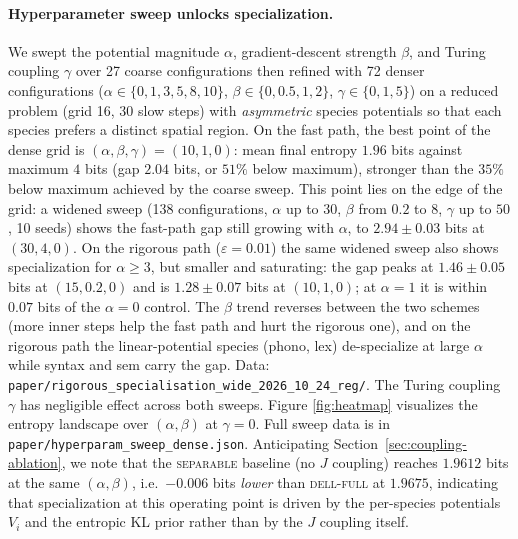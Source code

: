\documentclass[11pt]{article}
\begin{document}
\paragraph{Hyperparameter sweep unlocks specialization.}
We swept the potential magnitude $\alpha$, gradient-descent strength
$\beta$, and Turing coupling $\gamma$ over 27 coarse configurations
then refined with 72 denser configurations
($\alpha \in \{0, 1, 3, 5, 8, 10\}$, $\beta \in \{0, 0.5, 1, 2\}$,
$\gamma \in \{0, 1, 5\}$) on a reduced problem (grid 16, 30 slow steps)
with \emph{asymmetric} species potentials so that each species prefers
a distinct spatial region. On the fast path, the best point of the
dense grid is $(\alpha, \beta, \gamma) = (10, 1, 0)$: mean final
entropy $1.96$ bits against maximum $4$ bits (gap $2.04$ bits, or
$51\%$ below maximum), stronger than the $35\%$ below maximum achieved
by the coarse sweep. This point lies on the edge of the grid: a widened
sweep (138 configurations, $\alpha$ up to $30$, $\beta$ from $0.2$ to
$8$, $\gamma$ up to $50$, 10 seeds) shows the fast-path gap still
growing with $\alpha$, to $2.94 \pm 0.03$ bits at $(30, 4, 0)$. On the
rigorous path ($\varepsilon = 0.01$) the same widened sweep also shows
specialization for $\alpha \ge 3$, but smaller and saturating: the gap
peaks at $1.46 \pm 0.05$ bits at $(15, 0.2, 0)$ and is
$1.28 \pm 0.07$ bits at $(10, 1, 0)$; at $\alpha = 1$ it is within
$0.07$ bits of the $\alpha = 0$ control. The $\beta$ trend reverses
between the two schemes (more inner steps help the fast path and hurt
the rigorous one), and on the rigorous path the linear-potential
species (phono, lex) de-specialize at large $\alpha$ while syntax and
sem carry the gap. Data:
\texttt{paper/rigorous\_specialisation\_wide\_2026\_10\_24\_reg/}. The Turing coupling $\gamma$ has negligible effect
across both sweeps. Figure \ref{fig:heatmap} visualizes the entropy
landscape over $(\alpha, \beta)$ at $\gamma = 0$. Full sweep data is in
\texttt{paper/hyperparam\_sweep\_dense.json}. Anticipating
Section~\ref{sec:coupling-ablation}, we note that the \textsc{separable}
baseline (no $J$ coupling) reaches $1.9612$ bits at the same
$(\alpha, \beta)$, i.e.\ $-0.006$ bits \emph{lower} than \textsc{dell-full}
at $1.9675$, indicating that specialization at this operating point is
driven by the per-species potentials $V_i$ and the entropic KL prior
rather than by the $J$ coupling itself.
\end{document}
